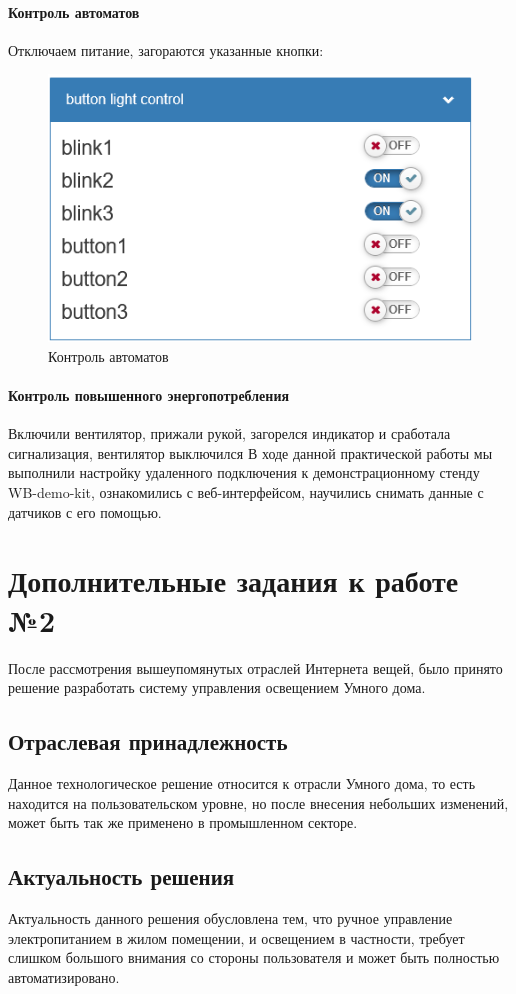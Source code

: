 \documentclass[a4paper,14pt]{extarticle}
\begin{document}
\paragraph{Контроль автоматов}
Отключаем питание, загораются указанные кнопки:

\begin{figure}[hbpt]
	\centering
	\includegraphics[width=0.5\linewidth]{images/auto-gui}
	\caption{Контроль автоматов}
	\label{fig:auto-gui}
\end{figure}
\paragraph{Контроль повышенного энергопотребления}
Включили вентилятор, прижали рукой, загорелся индикатор и сработала сигнализация, вентилятор выключился
В ходе данной практической работы мы выполнили настройку удаленного подключения к демонстрационному стенду  WB-demo-kit, ознакомились с веб-интерфейсом, научились снимать данные с датчиков с его помощью.


\section{Дополнительные задания к работе №2}
После рассмотрения вышеупомянутых отраслей Интернета вещей, было принято решение разработать систему управления освещением Умного дома.

\subsection{Отраслевая принадлежность}
Данное технологическое решение относится к отрасли Умного дома, то есть находится на пользовательском уровне, но после внесения небольших изменений, может быть так же применено в промышленном секторе.
\subsection{Актуальность решения}
Актуальность данного решения обусловлена тем, что ручное управление электропитанием в жилом помещении, и освещением в частности, требует слишком большого внимания со стороны пользователя и может быть полностью автоматизировано.
\end{document}
